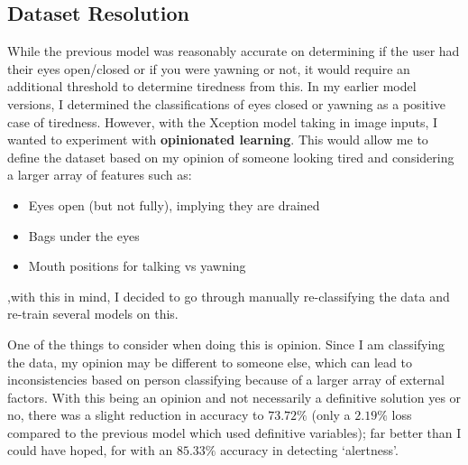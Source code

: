 \subsection{Dataset Resolution}
While the previous model was reasonably accurate on determining if the user had their eyes open/closed or if you were yawning or not,
it would require an additional threshold to determine tiredness from this. In my earlier model versions, I determined the classifications
of eyes closed or yawning as a positive case of tiredness. However, with the Xception model taking in image inputs, I wanted to experiment
with \textbf{opinionated learning}. This would allow me to define the dataset based on my opinion of someone looking tired and considering a larger
array of features such as:
\begin{itemize}
	\item Eyes open (but not fully), implying they are drained
	\item Bags under the eyes
	\item Mouth positions for talking vs yawning
\end{itemize}
,with this in mind, I decided to go through manually re-classifying the data and re-train several models on this.

One of the things to consider when doing this is opinion. Since I am classifying the data, my opinion may be different to someone else,
which can lead to inconsistencies based on person classifying because of a larger array of external factors.
With this being an opinion and not necessarily a definitive solution yes or no, there was a slight reduction in accuracy to $73.72\%$
(only a $2.19\%$ loss compared to the previous model which used definitive variables); far better than I could have hoped, for with
an $85.33\%$ accuracy in detecting ‘alertness’.

